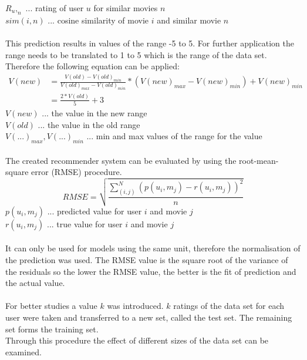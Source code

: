 \documentclass[a4paper,12pt,twoside]{article}
\begin{document}
$R_u,_n$ ... rating of user $u$ for similar movies $n$\\
$sim(i,n)$ ... cosine similarity of movie $i$ and similar movie $n$\\
\\
This prediction results in values of the range -5 to 5. For further application the range needs to be translated to 1 to 5 which is the range of the data set. \\
Therefore the following equation can be applied:\\
\begin{equation}
\begin{split}
V(new) & = \frac{ V(old) - V(old)_{min}}{V(old)_{max} - V(old)_{min}} * (V(new)_{max} - V(new)_{min}) + V(new)_{min}\\
& = \frac{ 2* V(old)}{ 5} + 3
\end{split}
\end{equation}
$V(new)$ ... the value in the new range\\
$V(old)$ ... the value in the old range\\
$V(...)_{max}, V(...)_{min}$ ... min and max values of the range for the value\\
\\
The created recommender system can be evaluated by using the root-mean-square error (RMSE) procedure. 
\begin{equation}
RMSE =  \sqrt{\frac{\displaystyle\sum_{(i,j)}^{N}(p(u_i, m_j) - r(u_i,m_j))^2 }{n}}
\end{equation}
$ p(u_i, m_j) $ ... predicted value for user $i$ and movie $j$ \\
$ r(u_i,m_j) $ ... true value for user $i$ and movie $j$\\
\\
It can only be used for models using the same unit, therefore the normalisation of the prediction was used.
The RMSE value is the square root of the variance of the residuals so the lower the RMSE value, the better is the fit of prediction and the actual value. \cite{rsme}\\
\\
For better studies a value $k$ was introduced. $k$ ratings of the data set for each user were taken and transferred to a new set, called the test set. The remaining set forms the training set. \\ 
Through this procedure the effect of different sizes of the data set can be examined.
\end{document}
